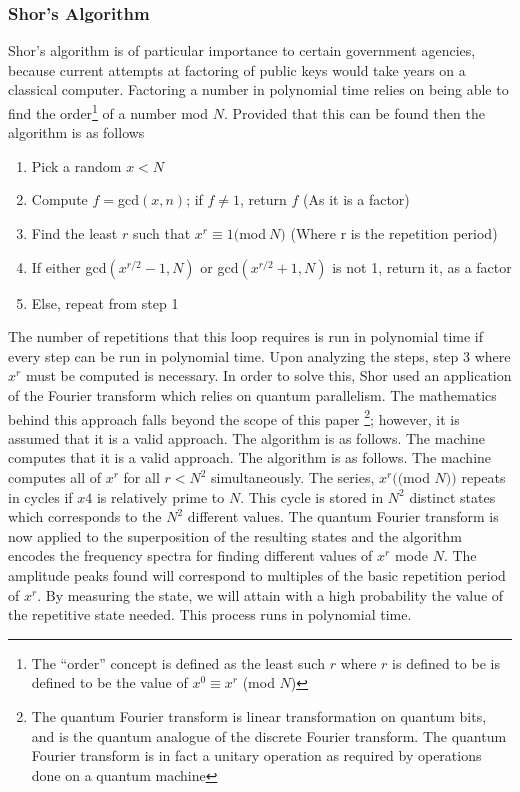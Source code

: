 \documentclass[12pt]{article}
\begin{document}
\subsubsection{Shor's Algorithm}
Shor's algorithm is of particular importance to certain government agencies, because current attempts at factoring of public keys would take years on a classical computer. Factoring a number in polynomial time relies on being able to find the order\footnote{The ``order'' concept is defined as the least such $r$ where $r$ is defined to be is defined to be the value of $x^0 \equiv x^r$ (mod $N$)} of a number mod $N$.\cite{cis4930} Provided that this can be found then the algorithm is as follows
\begin{enumerate}
\item Pick a random $x<N$
\item Compute $f = $gcd$(x, n)$; if $f\neq 1$, return $f$ (As it is a factor)
\item Find the least $r$ such that $x^r\equiv 1 ($mod$\:N)$ (Where r is the repetition period)
\item If either gcd$(x^{r/2}-1, N)$ or gcd$(x^{r/2}+1, N)$ is not 1, return it, as a factor
\item Else, repeat from step 1
\end{enumerate}
The number of repetitions that this loop requires is run in polynomial time if every step can be run in polynomial time. Upon analyzing the steps, step 3 where $x^r$ must be computed is necessary. In order to solve this, Shor used an application of the Fourier transform which relies on quantum parallelism. The mathematics behind this approach falls beyond the scope of this paper
\footnote{The quantum Fourier transform is linear transformation on quantum bits, and is the quantum analogue of the discrete Fourier transform. The quantum Fourier transform is in fact a unitary operation as required by operations done on a quantum machine}; however, it is assumed that it is a valid approach. The algorithm is as follows. The machine computes that it is a valid approach. The algorithm is as follows. The machine computes all of $x^r$ for all $r<N^2$ simultaneously. The series, $x^r(($mod $N))$ repeats in cycles if $x4$ is relatively prime to $N$. This cycle is stored in $N^2$ distinct states which corresponds to the $N^2$ different values. The quantum Fourier transform is now applied to the superposition of the resulting states and the algorithm encodes the frequency spectra for finding different values of $x^r$ mode $N$. The amplitude peaks found will correspond to multiples of the basic repetition period of $x^r$. By measuring the state, we will attain with a high probability the value of the repetitive state needed. This process runs in polynomial time. \cite{cis4930}
\end{document}
